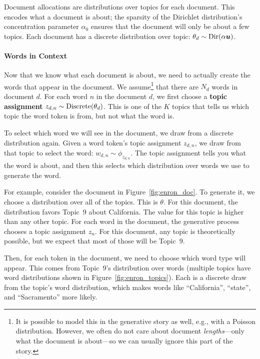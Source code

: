 Document allocations are distributions over topics for each document.  This
encodes what a document is about; the sparsity of the Dirichlet distribution's
concentration parameter $\alpha_0$ ensures that the document will only be about a
few topics.  Each document has a discrete distribution over topic: $\theta_d \sim
\mbox{Dir}(\alpha {\bm u})$.

\paragraph{Words in Context}

Now that we know what each document is about, we need to actually create the
words that appear in the document.  We assume\footnote{It is possible to model
  this in the generative story as well, e.g., with a Poisson distribution.
  However, we often do not care about document \emph{lengths}---only what the
  document is about---so we can usually ignore this part of the story.} that
there are $N_d$ words in document $d$.  For each word $n$ in the
document $d$, we first choose a {\bf topic assignment} $z_{d,n} \sim
\mbox{Discrete}( \theta_d)$.  This is one of the $K$ topics that tells us which topic the
word token is from, but not what the word is.

To select which word we will see in the document, we draw from a discrete
distribution again.  Given a word token's topic assignment $z_{d,n}$, we draw from that
topic to select the word: $w_{d,n} \sim \phi_{z_{d,n}}$.  The topic assignment
tells you what the word is about, and then this selects which distribution over
words we use to generate the word.  %

For example, consider the document in Figure~\ref{fig:enron_doc}.  To
generate it, we choose a distribution over all of the topics.  This is
$\theta$.  For this document, the distribution favors Topic~9 about
California.  The value for this topic is higher than any other topic.  For
each word in the document, the generative process chooses a topic
assignment $z_n$.  For this document, any topic is theoretically possible, but we expect that most of those will be Topic~9.

Then, for each token in the document, we need to choose which word type will appear.  This
comes from Topic~9's distribution over words (multiple topics have
word distributions shown in Figure~\ref{fig:enron_topics}).  Each is a
discrete draw from the topic's word distribution, which makes words
like ``California'', ``state'', and ``Sacramento'' more likely.

